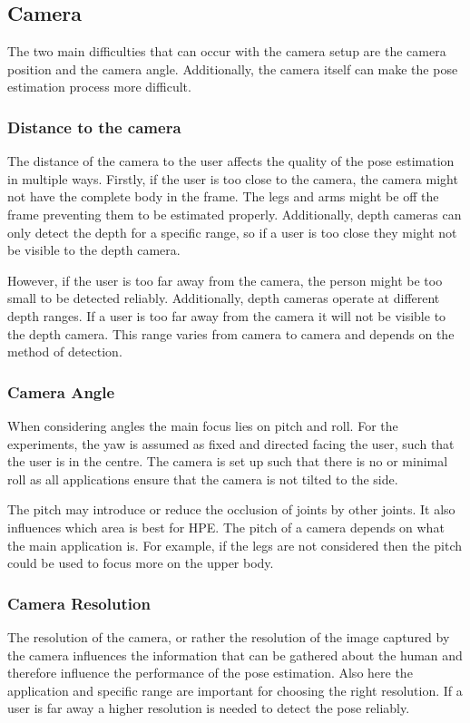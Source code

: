 \subsection{Camera}
\label{sec:camera}

The two main difficulties that can occur with the camera setup are the camera position and the camera angle. Additionally, the camera itself can make the pose estimation process more difficult. 

\subsubsection{Distance to the camera}

The distance of the camera to the user affects the quality of the pose estimation in multiple ways. Firstly, if the user is too close to the camera, the camera might not have the complete body in the frame. The legs and arms might be off the frame preventing them to be estimated properly. Additionally, depth cameras can only detect the depth for a specific range, so if a user is too close they might not be visible to the depth camera.

However, if the user is too far away from the camera, the person might be too small to be detected reliably. Additionally, depth cameras operate at different depth ranges. If a user is too far away from the camera it will not be visible to the depth camera. This range varies from camera to camera and depends on the method of detection.

\subsubsection{Camera Angle}

When considering angles the main focus lies on pitch and roll. For the experiments, the yaw is assumed as fixed and directed facing the user, such that the user is in the centre. The camera is set up such that there is no or minimal roll as all applications ensure that the camera is not tilted to the side.

The pitch may introduce or reduce the occlusion of joints by other joints. It also influences which area is best for HPE. The pitch of a camera depends on what the main application is. For example, if the legs are not considered then the pitch could be used to focus more on the upper body.

\subsubsection{Camera Resolution}

The resolution of the camera, or rather the resolution of the image captured by the camera influences the information that can be gathered about the human and therefore influence the performance of the pose estimation. Also here the application and specific range are important for choosing the right resolution. If a user is far away a higher resolution is needed to detect the pose reliably.
